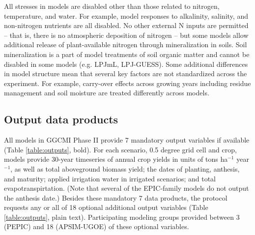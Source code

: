 \documentclass[gmd, manuscript]{copernicus} %
\begin{document}
All stresses in models are disabled other than those related to nitrogen, temperature, and water. 
For example, model responses to alkalinity, salinity, and non-nitrogen nutrients are all disabled. 
No other external N inputs are permitted -- that is, there is no atmospheric deposition of nitrogen --  but some models allow additional release of plant-available nitrogen through mineralization in soils. 
Soil mineralization is a part of model treatments of soil organic matter and cannot be disabled in some models (e.g. LPJmL, LPJ-GUESS). 
Some additional differences in model structure mean that several key factors are not standardized across the experiment. 
For example, carry-over effects across growing years including residue management and soil moisture are treated differently across models.

\subsection{Output data products}
All models in GGCMI Phase II provide 7 mandatory output variables if available (Table \ref{table:outputs}, bold).
For each scenario, 0.5 degree grid cell and crop, models provide 30-year timeseries of annual crop yields in units of tons ha$^{-1}$ year$^{-1}$, as well as total aboveground biomass yield; the dates of planting, anthesis, and maturity; applied irrigation water in irrigated scenarios; and total evapotranspirtation. 
(Note that several of the EPIC-family models do not output the anthesis date.)
Besides these mandatory 7 data products, the protocol requests any or all of 18 optional additional output variables (Table \ref{table:outputs}, plain text).
Participating modeling groups provided between 3 (PEPIC) and 18 (APSIM-UGOE) of these optional variables. 
\end{document}
